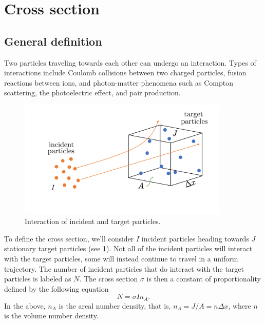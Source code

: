\documentclass[a4paper,11pt]{report}
\begin{document}
\section{Cross section}
\subsection{General definition}
Two particles traveling towards each other can undergo an interaction. Types of interactions include Coulomb collisions between two charged particles, fusion reactions between ions, and photon-matter phenomena such as Compton scattering, the photoelectric effect, and pair production.

\begin{figure}[ht]
    \centering
    \includegraphics[width=10cm]{../../images/cross_section.pdf}
    \caption{Interaction of incident and target particles.}
    \label{fig:cross_many_particles}
\end{figure}
To define the cross section, we'll consider $I$ incident particles heading towards $J$ stationary target particles (see \cref{fig:cross_many_particles}). Not all of the incident particles will interact with the target particles, some will instead continue to travel in a uniform trajectory. The number of incident particles that do interact with the target particles is labeled as $N$. The cross section $\sigma$ is then a constant of proportionality defined by the following equation
\begin{equation}
    \label{eq:cross_def}
    N = \sigma I n_A.
\end{equation}
In the above, $n_A$ is the areal number density, that is, $n_A = J / A = n \Delta x$, where $n$ is the volume number density.
\end{document}
